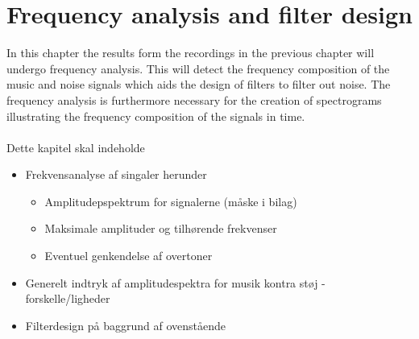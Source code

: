 \chapter{Frequency analysis and filter design}
In this chapter the results form the recordings in the previous chapter will undergo frequency analysis. This will detect the frequency composition of the music and noise signals which aids the design of filters to filter out noise. The frequency analysis is furthermore necessary for the creation of spectrograms illustrating the frequency composition of the signals in time.\\\\
Dette kapitel skal indeholde
\begin{itemize}
\item Frekvensanalyse af singaler herunder
\begin{itemize}
\item Amplitudepspektrum for signalerne (måske i bilag)
\item Maksimale amplituder og tilhørende frekvenser
\item Eventuel genkendelse af overtoner
\end{itemize}
\item Generelt indtryk af amplitudespektra for musik kontra støj - forskelle/ligheder
\item Filterdesign på baggrund af ovenstående
\end{itemize}